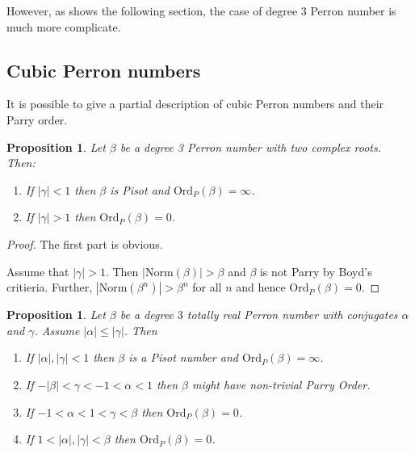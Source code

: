 \documentclass[12pt]{article}
\theoremstyle{plain}
\newtheorem{proposition}[theorem]{Proposition}
\theoremstyle{remark}
\newcommand{\OrdP}{\mathrm{Ord}_{P}}
\begin{document}
However, as shows the following section, the case of degree 3 Perron number is much more complicate. 

\subsection{Cubic Perron numbers}


It is possible to give a partial description of cubic Perron numbers and their Parry order.  

\begin{proposition}
    Let $\beta$ be a degree 3 Perron number with two complex roots. 
    Then:
    \begin{enumerate}
        \item If $|\gamma| < 1$ then $\beta$ is Pisot and $\OrdP(\beta) = \infty$.
        \item If $|\gamma| > 1$ then $\OrdP(\beta) = 0$.
    \end{enumerate}
\end{proposition}

\begin{proof}
    The first part is obvious.

    Assume that $|\gamma| > 1$.
    Then $|\mathrm{Norm}(\beta)| > \beta$ and $\beta$ is 
    not Parry by Boyd's critieria.
    Further, $|\mathrm{Norm}(\beta^n)| > \beta^n$ for all $n$ and hence $\OrdP(\beta) = 0$.   
\end{proof}

\begin{proposition} \label{prop:cubic}
    Let $\beta$ be a degree $3$ totally real Perron number with conjugates $\alpha$ and $\gamma$. Assume $|\alpha| \leq |\gamma|$.  Then
    \begin{enumerate}
        \item If $|\alpha|, |\gamma| < 1$ then $\beta$ is a Pisot number and $\OrdP(\beta) = \infty$. \label{prt:cubic 1}
        \item If $-|\beta| < \gamma < -1 < \alpha < 1$ then $\beta$ {\em might} have non-trivial Parry Order.\label{prt:cubic 2}
        \item If $-1 < \alpha < 1 < \gamma < \beta$ then $\OrdP(\beta) = 0$.\label{prt:cubic 3}
        \item If $1 < |\alpha|, |\gamma| < \beta$ then $\OrdP(\beta) = 0$.\label{prt:cubic 4}
    \end{enumerate}
\end{proposition}
\end{document}
